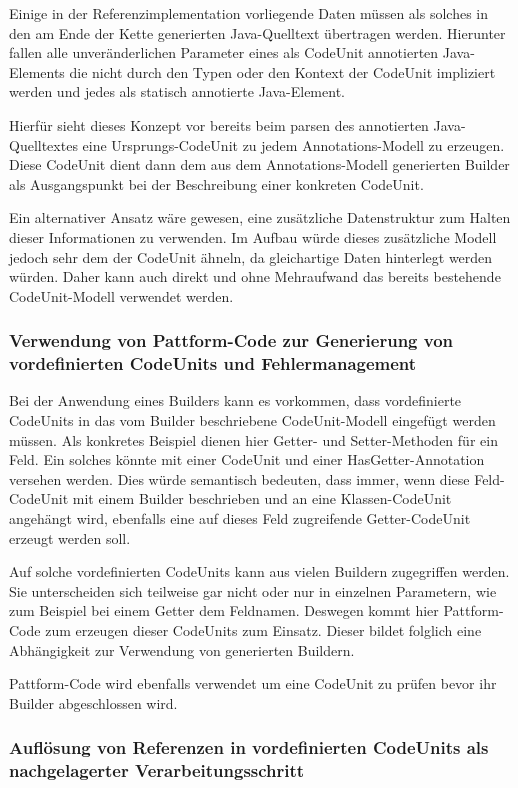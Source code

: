 \documentclass[12pt,oneside,a4paper,parskip]{scrbook}
\begin{document}
Einige in der Referenzimplementation vorliegende Daten müssen als solches in den am Ende der Kette generierten Java-Quelltext übertragen werden. Hierunter fallen alle unveränderlichen Parameter eines als CodeUnit annotierten Java-Elements die nicht durch den Typen oder den Kontext der CodeUnit impliziert werden und jedes als statisch annotierte Java-Element.

Hierfür sieht dieses Konzept vor bereits beim parsen des annotierten Java-Quelltextes eine Ursprungs-CodeUnit zu jedem Annotations-Modell zu erzeugen. Diese CodeUnit dient dann dem aus dem Annotations-Modell generierten Builder als Ausgangspunkt bei der Beschreibung einer konkreten CodeUnit.

Ein alternativer Ansatz wäre gewesen, eine zusätzliche Datenstruktur zum Halten dieser Informationen zu verwenden. Im Aufbau würde dieses zusätzliche Modell jedoch sehr dem der CodeUnit ähneln, da gleichartige Daten hinterlegt werden würden. Daher kann auch direkt und ohne Mehraufwand das bereits bestehende CodeUnit-Modell verwendet werden.

\subsubsection{Verwendung von Pattform-Code zur Generierung von vordefinierten CodeUnits und Fehlermanagement}

Bei der Anwendung eines Builders kann es vorkommen, dass vordefinierte CodeUnits in das vom Builder beschriebene CodeUnit-Modell eingefügt werden müssen. Als konkretes Beispiel dienen hier Getter- und Setter-Methoden für ein Feld. Ein solches könnte mit einer CodeUnit und einer HasGetter-Annotation versehen werden. Dies würde semantisch bedeuten, dass immer, wenn diese Feld-CodeUnit mit einem Builder beschrieben und an eine Klassen-CodeUnit angehängt wird, ebenfalls eine auf dieses Feld zugreifende Getter-CodeUnit erzeugt werden soll.

Auf solche vordefinierten CodeUnits kann aus vielen Buildern zugegriffen werden. Sie unterscheiden sich teilweise gar nicht oder nur in einzelnen Parametern, wie zum Beispiel bei einem Getter dem Feldnamen. Deswegen kommt hier Pattform-Code zum erzeugen dieser CodeUnits zum Einsatz. Dieser bildet folglich eine Abhängigkeit zur Verwendung von generierten Buildern.

Pattform-Code wird ebenfalls verwendet um eine CodeUnit zu prüfen bevor ihr Builder abgeschlossen wird.

\subsubsection{Auflösung von Referenzen in vordefinierten CodeUnits als nachgelagerter Verarbeitungsschritt}
\end{document}
